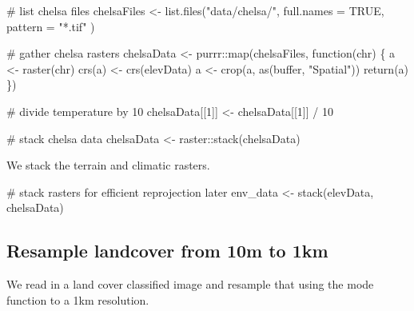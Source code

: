 \documentclass[]{article}
\newenvironment{Shaded}{}{}
\newcommand{\CommentTok}[1]{\textcolor[rgb]{0.00,0.50,0.00}{#1}}
\newcommand{\ControlFlowTok}[1]{\textcolor[rgb]{0.00,0.00,1.00}{#1}}
\newcommand{\DataTypeTok}[1]{#1}
\newcommand{\DecValTok}[1]{#1}
\newcommand{\KeywordTok}[1]{\textcolor[rgb]{0.00,0.00,1.00}{#1}}
\newcommand{\NormalTok}[1]{#1}
\newcommand{\OperatorTok}[1]{#1}
\newcommand{\OtherTok}[1]{\textcolor[rgb]{1.00,0.25,0.00}{#1}}
\newcommand{\StringTok}[1]{\textcolor[rgb]{0.00,0.50,0.50}{#1}}
\begin{document}
\begin{Shaded}
\begin{Highlighting}[]
\CommentTok{# list chelsa files}
\NormalTok{chelsaFiles <-}\StringTok{ }\KeywordTok{list.files}\NormalTok{(}\StringTok{"data/chelsa/"}\NormalTok{,}
  \DataTypeTok{full.names =} \OtherTok{TRUE}\NormalTok{,}
  \DataTypeTok{pattern =} \StringTok{"*.tif"}
\NormalTok{)}

\CommentTok{# gather chelsa rasters}
\NormalTok{chelsaData <-}\StringTok{ }\NormalTok{purrr}\OperatorTok{::}\KeywordTok{map}\NormalTok{(chelsaFiles, }\ControlFlowTok{function}\NormalTok{(chr) \{}
\NormalTok{  a <-}\StringTok{ }\KeywordTok{raster}\NormalTok{(chr)}
  \KeywordTok{crs}\NormalTok{(a) <-}\StringTok{ }\KeywordTok{crs}\NormalTok{(elevData)}
\NormalTok{  a <-}\StringTok{ }\KeywordTok{crop}\NormalTok{(a, }\KeywordTok{as}\NormalTok{(buffer, }\StringTok{"Spatial"}\NormalTok{))}
  \KeywordTok{return}\NormalTok{(a)}
\NormalTok{\})}

\CommentTok{# divide temperature by 10}
\NormalTok{chelsaData[[}\DecValTok{1}\NormalTok{]] <-}\StringTok{ }\NormalTok{chelsaData[[}\DecValTok{1}\NormalTok{]] }\OperatorTok{/}\StringTok{ }\DecValTok{10}

\CommentTok{# stack chelsa data}
\NormalTok{chelsaData <-}\StringTok{ }\NormalTok{raster}\OperatorTok{::}\KeywordTok{stack}\NormalTok{(chelsaData)}
\end{Highlighting}
\end{Shaded}

We stack the terrain and climatic rasters.

\begin{Shaded}
\begin{Highlighting}[]
\CommentTok{# stack rasters for efficient reprojection later}
\NormalTok{env_data <-}\StringTok{ }\KeywordTok{stack}\NormalTok{(elevData, chelsaData)}
\end{Highlighting}
\end{Shaded}

\hypertarget{resample-landcover-from-10m-to-1km}{%
\subsection{Resample landcover from 10m to 1km}\label{resample-landcover-from-10m-to-1km}}

We read in a land cover classified image and resample that using the mode function to a 1km resolution.
\end{document}
